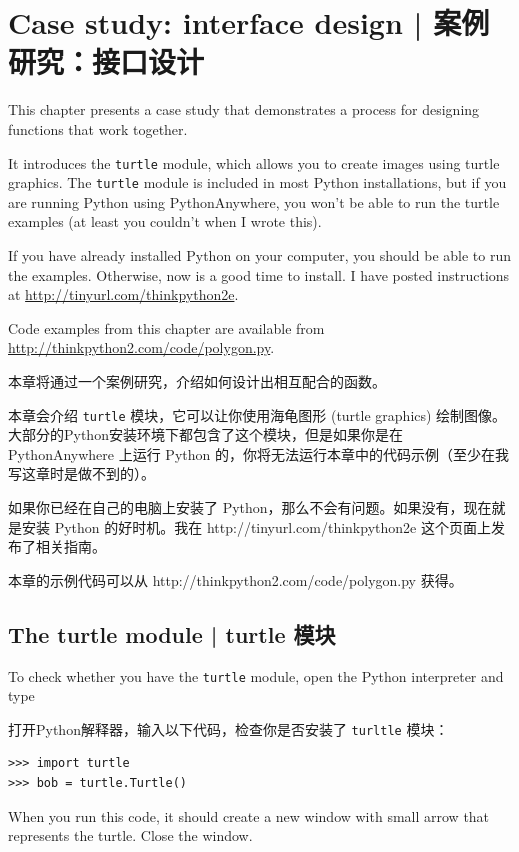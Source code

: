 

\chapter{Case study: interface design  |  案例研究：接口设计}
\label{turtlechap}

This chapter presents a case study that demonstrates a process for
designing functions that work together.

It introduces the {\tt turtle} module, which allows you to
create images using turtle graphics.  The {\tt turtle} module is
included in most Python installations, but if you are running Python
using PythonAnywhere, you won't be able to run the turtle examples (at
least you couldn't when I wrote this).

If you have already installed Python on your computer, you should
be able to run the examples.  Otherwise, now is a good time
to install.  I have posted instructions at
\url{http://tinyurl.com/thinkpython2e}.

Code examples from this chapter are available from
\url{http://thinkpython2.com/code/polygon.py}.

本章将通过一个案例研究，介绍如何设计出相互配合的函数。

本章会介绍 \lstinline{turtle} 模块，它可以让你使用海龟图形 (turtle graphics) 绘制图像。大部分的Python安装环境下都包含了这个模块，但是如果你是在 PythonAnywhere 上运行 Python 的，你将无法运行本章中的代码示例（至少在我写这章时是做不到的）。

如果你已经在自己的电脑上安装了 Python，那么不会有问题。如果没有，现在就是安装 Python 的好时机。我在 http://tinyurl.com/thinkpython2e 这个页面上发布了相关指南。

本章的示例代码可以从 http://thinkpython2.com/code/polygon.py 获得。

\section{The turtle module  |  turtle 模块}
\label{turtle}

To check whether you have the {\tt turtle} module, open the Python
interpreter and type

打开Python解释器，输入以下代码，检查你是否安装了 \lstinline{turltle} 模块：

\begin{lstlisting}
>>> import turtle
>>> bob = turtle.Turtle()
\end{lstlisting}

When you run this code, it should create a new window
with small arrow that represents the turtle.  Close the window.

